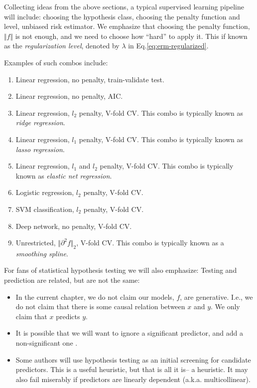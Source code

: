 \documentclass[]{book}
\providecommand{\tightlist}{%
  \setlength{\itemsep}{0pt}\setlength{\parskip}{0pt}}
\theoremstyle{definition}
\theoremstyle{definition}
\theoremstyle{definition}
\theoremstyle{remark}
\begin{document}
Collecting ideas from the above sections, a typical supervised learning
pipeline will include: choosing the hypothesis class, choosing the
penalty function and level, unbiased risk estimator. We emphasize that
choosing the penalty function, \(\Vert f \Vert\) is not enough, and we
need to choose how ``hard'' to apply it. This if known as the
\emph{regularization level}, denoted by \(\lambda\) in
Eq.\eqref{eq:erm-regularized}.

Examples of such combos include:

\begin{enumerate}
\def\labelenumi{\arabic{enumi}.}
\tightlist
\item
  Linear regression, no penalty, train-validate test.
\item
  Linear regression, no penalty, AIC.
\item
  Linear regression, \(l_2\) penalty, V-fold CV. This combo is typically
  known as \emph{ridge regression}.
\item
  Linear regression, \(l_1\) penalty, V-fold CV. This combo is typically
  known as \emph{lasso regression}.
\item
  Linear regression, \(l_1\) and \(l_2\) penalty, V-fold CV. This combo
  is typically known as \emph{elastic net regression}.
\item
  Logistic regression, \(l_2\) penalty, V-fold CV.
\item
  SVM classification, \(l_2\) penalty, V-fold CV.
\item
  Deep network, no penalty, V-fold CV.
\item
  Unrestricted, \(\Vert \partial^2 f \Vert_2\), V-fold CV. This combo is
  typically known as a \emph{smoothing spline}.
\end{enumerate}

For fans of statistical hypothesis testing we will also emphasize:
Testing and prediction are related, but are not the same:

\begin{itemize}
\tightlist
\item
  In the current chapter, we do not claim our models, \(f\), are
  generative. I.e., we do not claim that there is some causal relation
  between \(x\) and \(y\). We only claim that \(x\) predicts \(y\).
\item
  It is possible that we will want to ignore a significant predictor,
  and add a non-significant one \citep{foster2004variable}.
\item
  Some authors will use hypothesis testing as an initial screening for
  candidate predictors. This is a useful heuristic, but that is all it
  is-- a heuristic. It may also fail miserably if predictors are
  linearly dependent (a.k.a. multicollinear).
\end{itemize}
\end{document}
